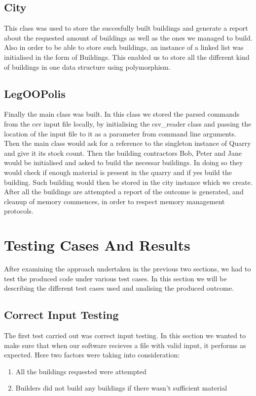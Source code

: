 \documentclass[12pt, A4]{report}
\begin{document}
		\subsection*{City}
		This class was used to store the succesfully built buildings and generate a report about the requested amount of buildings as well as the ones we managed to build. Also in order to be able to store such buildings, an instance of a linked list was initialised in the form of Buildings. This enabled us to store all the different kind of buildings in one data structure using polymorphism.

		\subsection*{LegOOPolis}
		Finally the main class was built. In this class we stored the parsed commands from the csv input file locally, by initialising the csv\_reader class and passing the location of the input file to it as a parameter from command line arguments. Then the main class would ask for a reference to the singleton instance of Quarry and give it its stock count. Then the building contractors Bob, Peter and Jane would be initialised and asked to build the necessar buildings. In doing so they would check if enough material is present in the quarry and if yes build the building. Such building would then be stored in the city instance which we create. After all the buildings are attempted a report of the outcome is generated, and cleanup of memory commences, in order to respect memory management protocols.

	\section*{Testing Cases And Results}
	After examining the approach undertaken in the previous two sections, we had to test the produced code under various test cases. In this section we will be describing the different test cases used and analising the produced outcome. 

		\subsection*{Correct Input Testing}
		The first test carried out was correct input testing. In this section we wanted to make sure that when our software recieves a file with valid input, it performs as expected. Here two factors were taking into consideration:
			\begin{enumerate}
				\item All the buildings requested were attempted
				\item Builders did not build any buildings if there wasn't sufficient material
			\end{enumerate}
\end{document}
